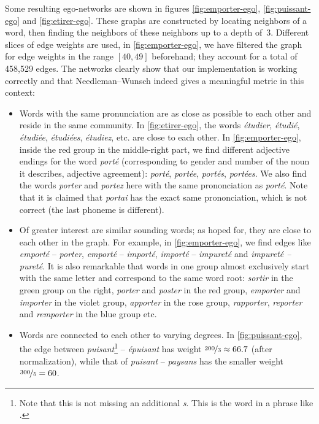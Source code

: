 Some resulting ego-networks are shown in figures \ref{fig:emporter-ego}, \ref{fig:puissant-ego} and \ref{fig:etirer-ego}. These graphs are constructed by locating neighbors of a word, then finding the neighbors of these neighbors up to a depth of~3. Different slices of edge weights are used, \eg in \autoref{fig:emporter-ego}, we have filtered the graph for edge weights in the range $[40,49]$ beforehand; they account for a total of 458,529 edges. The networks clearly show that our implementation is working correctly and that Needleman–Wunsch indeed gives a meaningful metric in this context:

\begin{itemize}[leftmargin=0.3cm]
    \item Words with the same pronunciation are as close as possible to each other and reside in the same community. In \autoref{fig:etirer-ego}, the words \textit{étudier}, \textit{étudié}, \textit{étudiée}, \textit{étudiées}, \textit{étudiez}, etc. are close to each other. In \autoref{fig:emporter-ego}, inside the red group in the middle-right part, we find different adjective endings for the word \textit{porté} (corresponding to gender and number of the noun it describes, \ie adjective agreement): \textit{porté}, \textit{portée}, \textit{portés}, \textit{portées}. We also find the words \textit{porter} and \textit{portez} here with the same prononciation as \textit{porté}. Note that it is claimed that \textit{portai} has the exact same prononciation, which is not correct (the last phoneme is different).
    
    \item Of greater interest are similar sounding words; as hoped for, they are close to each other in the graph. For example, in \autoref{fig:emporter-ego}, we find edges like \textit{emporté} -- \textit{porter}, \textit{emporté} -- \textit{importé}, \textit{importé} -- \textit{impureté} and \textit{impureté -- pureté}. It is also remarkable that words in one group almost exclusively start with the same letter and correspond to the same word root: \textit{sortir} in the green group on the right, \textit{porter} and \textit{poster} in the red group, \textit{emporter} and \textit{importer} in the violet group, \textit{apporter} in the rose group, \textit{rapporter}, \textit{reporter} and \textit{remporter} in the blue group etc.
    
    \item Words are connected to each other to varying degrees. In \autoref{fig:puissant-ego}, the edge between \textit{puisant}\footnote{Note that this is not missing an additional \textit{s}. This is the word in a phrase like .} -- \textit{épuisant} has weight $\nicefrac{200}{3}\approx 66.7$ (after normalization), while that of \textit{puisant} -- \textit{paysans} has the smaller weight $\nicefrac{300}{5} = 60$.
\end{itemize}

